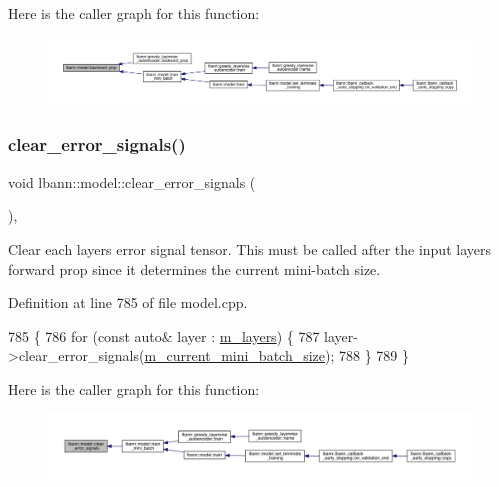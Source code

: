 Here is the caller graph for this function\+:\nopagebreak
\begin{figure}[H]
\begin{center}
\leavevmode
\includegraphics[width=350pt]{classlbann_1_1model_a2ce4444efaab4dd1236c837d6847e438_icgraph}
\end{center}
\end{figure}
\mbox{\label{classlbann_1_1model_a43b3ed176749e0aab6065f274ec2a717}} 
\subsubsection{\texorpdfstring{clear\+\_\+error\+\_\+signals()}{clear\_error\_signals()}}
{\footnotesize\ttfamily void lbann\+::model\+::clear\+\_\+error\+\_\+signals (\begin{DoxyParamCaption}{ }\end{DoxyParamCaption})\hspace{0.3cm}{\ttfamily [protected]}, {\ttfamily [virtual]}}

Clear each layer\textquotesingle{}s error signal tensor. This must be called after the input layer\textquotesingle{}s forward prop since it determines the current mini-\/batch size. 

Definition at line 785 of file model.\+cpp.


\begin{DoxyCode}
785                                 \{
786   \textcolor{keywordflow}{for} (\textcolor{keyword}{const} \textcolor{keyword}{auto}& layer : \hyperlink{classlbann_1_1model_a0229fc226ec163d1411548446104569d}{m\_layers}) \{
787     layer->clear\_error\_signals(\hyperlink{classlbann_1_1model_a982cea92d230bab5a47df504f02daf98}{m\_current\_mini\_batch\_size});
788   \}
789 \}
\end{DoxyCode}
Here is the caller graph for this function\+:\nopagebreak
\begin{figure}[H]
\begin{center}
\leavevmode
\includegraphics[width=350pt]{classlbann_1_1model_a43b3ed176749e0aab6065f274ec2a717_icgraph}
\end{center}
\end{figure}
\mbox{\label{classlbann_1_1model_ae4ca41f514498a37503ecc6ba1600bab}} 
